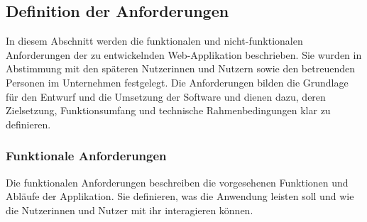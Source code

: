 \subsection{Definition der Anforderungen}
\label{sec:definition-der-anforderungen-und-ihre-interpretation}


In diesem Abschnitt werden die funktionalen und nicht-funktionalen Anforderungen der zu entwickelnden Web-Applikation beschrieben.
Sie wurden in Abstimmung mit den späteren Nutzerinnen und Nutzern sowie den betreuenden Personen im Unternehmen festgelegt.
Die Anforderungen bilden die Grundlage für den Entwurf und die Umsetzung der Software und dienen dazu, deren Zielsetzung, Funktionsumfang und technische Rahmenbedingungen klar zu definieren.


\subsubsection{Funktionale Anforderungen}\label{subsec:funktionale-anforderungen}

Die funktionalen Anforderungen beschreiben die vorgesehenen Funktionen und Abläufe der Applikation.
Sie definieren, was die Anwendung leisten soll und wie die Nutzerinnen und Nutzer mit ihr interagieren können.

